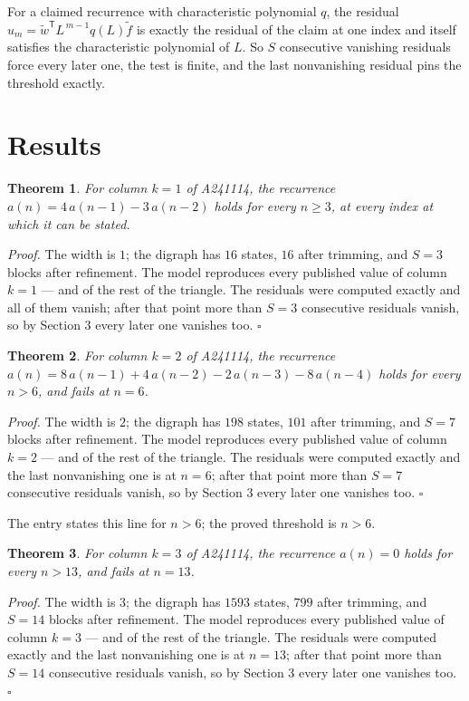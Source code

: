 \documentclass[11pt]{article}
\newtheorem{theorem}{Theorem}
\theoremstyle{definition}
\begin{document}
For a claimed recurrence with characteristic polynomial $q$, the residual $u_m = \tilde w^{\mathsf T}L^{\,m-1}q(L)\tilde f$ is exactly the residual of the claim at one index and itself satisfies the characteristic polynomial of $L$. So $S$ consecutive vanishing residuals force every later one, the test is finite, and the last nonvanishing residual pins the threshold exactly.

\section{Results}

\begin{theorem} For column $k = 1$ of A241114, the recurrence $a(n) = 4\,a(n-1) - 3\,a(n-2)$ holds for every $n \ge 3$, at every index at which it can be stated.\end{theorem}

{\itshape Proof.} The width is $1$; the digraph has $16$ states, $16$ after trimming, and $S = 3$ blocks after refinement. The model reproduces every published value of column $k = 1$ --- and of the rest of the triangle. The residuals were computed exactly and all of them vanish; after that point more than $S = 3$ consecutive residuals vanish, so by Section 3 every later one vanishes too. $\square$

\begin{theorem} For column $k = 2$ of A241114, the recurrence $a(n) = 8\,a(n-1) + 4\,a(n-2) - 2\,a(n-3) - 8\,a(n-4)$ holds for every $n > 6$, and fails at $n = 6$.\end{theorem}

{\itshape Proof.} The width is $2$; the digraph has $198$ states, $101$ after trimming, and $S = 7$ blocks after refinement. The model reproduces every published value of column $k = 2$ --- and of the rest of the triangle. The residuals were computed exactly and the last nonvanishing one is at $n = 6$; after that point more than $S = 7$ consecutive residuals vanish, so by Section 3 every later one vanishes too. $\square$

The entry states this line for $n > 6$; the proved threshold is $n > 6$.

\begin{theorem} For column $k = 3$ of A241114, the recurrence $a(n) = 0$ holds for every $n > 13$, and fails at $n = 13$.\end{theorem}

{\itshape Proof.} The width is $3$; the digraph has $1593$ states, $799$ after trimming, and $S = 14$ blocks after refinement. The model reproduces every published value of column $k = 3$ --- and of the rest of the triangle. The residuals were computed exactly and the last nonvanishing one is at $n = 13$; after that point more than $S = 14$ consecutive residuals vanish, so by Section 3 every later one vanishes too. $\square$
\end{document}
